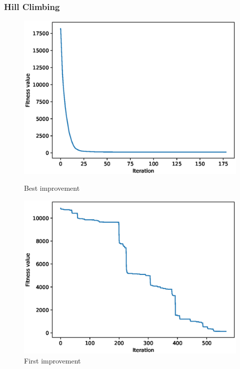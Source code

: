\documentclass{article}
\begin{document}
\subsubsection{Hill Climbing}
\begin{figure}[!htbp]
	\centering
	\begin{minipage}{.48\textwidth}
		\centering
		\includegraphics[scale=.4]{experiment_2a_rosenbrock/max_fitness_0.eps}
		\caption{Best improvement}
	\end{minipage}\hfill
	\begin{minipage}{.48\textwidth}
		\centering
		\includegraphics[scale=.4]{experiment_2b_rosenbrock/max_fitness_0.eps}
		\caption{First improvement}
	\end{minipage}\hfill
\end{figure}
\FloatBarrier
\end{document}
